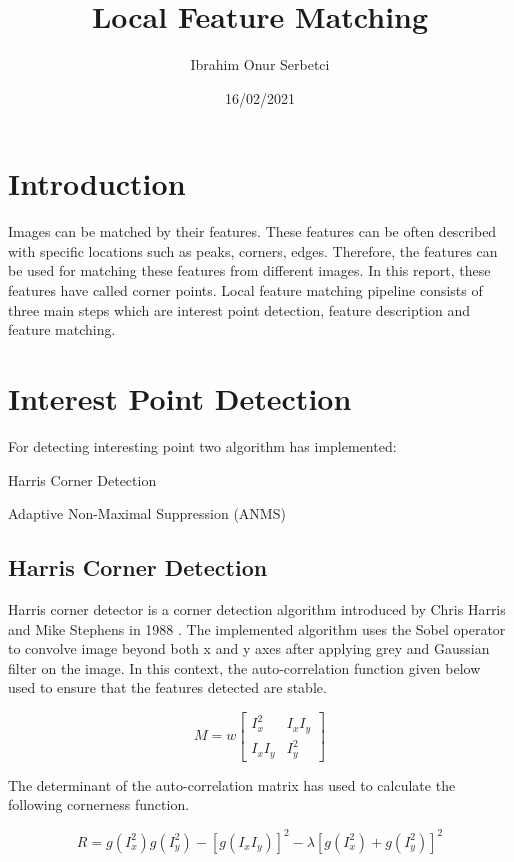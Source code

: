 \documentclass[a4paper]{article}
\title{Local Feature Matching}
\author{Ibrahim Onur Serbetci}
\date{16/02/2021}
\begin{document}
\maketitle
\section{Introduction}

Images can be matched by their features. These features can be often described with specific locations such as peaks, corners, edges. Therefore, the features can be used for matching these features from different images. In this report, these features have called corner points. Local feature matching pipeline consists of three main steps which are interest point detection, feature description and feature matching.

\section{Interest Point Detection}
For detecting interesting point two algorithm has implemented:

\textbullet{} Harris Corner Detection

\textbullet{} Adaptive Non-Maximal Suppression (ANMS)

\subsection{Harris Corner Detection}

Harris corner detector is a corner detection algorithm introduced by Chris Harris and Mike Stephens in 1988 \cite{harris1988combined}. The implemented algorithm uses the Sobel operator to convolve image beyond both x and y axes after applying grey and Gaussian filter on the image. In this context, the auto-correlation function given below used to ensure that the features detected are stable.

\begin{equation}
M=w\begin{bmatrix}I_x^2 & I_xI_y \\ I_xI_y & I_y^2\end{bmatrix}
\end{equation}

The determinant of the auto-correlation matrix has used to calculate the following cornerness function.

\begin{equation}
R=g(I_x^2)g(I^2_y)-[g(I_xI_y)]^2-\lambda[g(I_x^2)+g(I_y^2)]^2
\end{equation}
\end{document}
